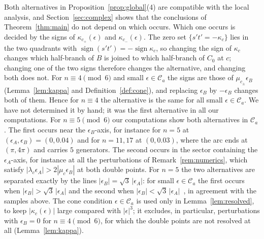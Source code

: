 \begin{remark}\label{rem:pattern}
Both alternatives in Proposition~\ref{prop:global}(4) are compatible with the local analysis, and Section~\ref{sec:complex}
shows that the conclusions of Theorem~\ref{thm:main} do not depend on which occurs. Which one occurs is decided by the
signs of $\kappa_{c_+}(\epsilon)$ and $\kappa_{c_-}(\epsilon)$. The zero set $\{s't'=-\kappa_c\}$ lies in the two quadrants with
$\operatorname{sign}(s't')=-\operatorname{sign}\kappa_c$, so changing the sign of $\kappa_c$ changes which half-branch of $B$ is joined to which
half-branch of $C_0$ at $c$; changing one of the two signs therefore changes the alternative, and changing both does not.
For $n\equiv4\pmod6$ and small $\epsilon\in\mathcal C_a$ the signs are those of $\mu_{c_\pm}\epsilon_B$ (Lemma~\ref{lem:kappa} and
Definition~\ref{def:cone}), and replacing $\epsilon_B$ by $-\epsilon_B$ changes both of them. Hence for $n\equiv4$ the alternative is
the same for all small $\epsilon\in\mathcal C_a$. We have not determined it by hand; it was the first alternative in all our
computations. For $n\equiv5\pmod6$ our computations show both alternatives in $\mathcal C_a$. The first occurs near the
$\epsilon_B$-axis, for instance for $n=5$ at $(\epsilon_A,\epsilon_B)=(0,0.04)$ and for $n=11,17$ at $(0,0.03)$, where the arc ends
at $(\pi,4\pi)$ and carries $5$ generators. The second occurs in the sector containing the $\epsilon_A$-axis, for instance at all the perturbations
of Remark~\ref{rem:numerics}, which satisfy $|\lambda_c\epsilon_A|>2|\mu_c\epsilon_B|$ at both double points. For $n=5$ the two alternatives are separated
exactly by the lines $|\epsilon_B|=\sqrt3\,|\epsilon_A|$: for small $\epsilon\in\mathcal C_a$ the first occurs when
$|\epsilon_B|>\sqrt3\,|\epsilon_A|$ and the second when $|\epsilon_B|<\sqrt3\,|\epsilon_A|$~\cite[Prop.~4.10]{WuebbenII}, in agreement with the
samples above. The cone condition $\epsilon\in\mathcal C_a$ is used only in Lemma~\ref{lem:resolved}, to keep $|\kappa_c(\epsilon)|$
large compared with $|\epsilon|^3$; it excludes, in particular, perturbations with $\epsilon_B=0$ for $n\equiv4\pmod 6$, for
which the double points are not resolved at all (Lemma~\ref{lem:kappa}).
\end{remark}
